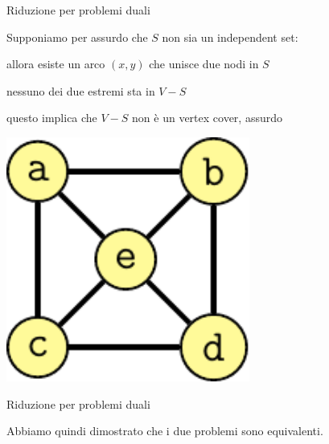 \begin{frame}{Riduzione per problemi duali}

Supponiamo per assurdo che $S$ non sia un independent set:
\BI
\item allora esiste un arco $(x,y)$ che unisce due nodi in $S$
\item nessuno dei due estremi sta in $V-S$
\item questo implica che $V-S$ non è un vertex cover, assurdo
\EI

\begin{center}
\includegraphics[width=0.6\textwidth,page=3]{cover.pdf}
\end{center}

\end{frame}

\begin{frame}{Riduzione per problemi duali}

Abbiamo quindi dimostrato che i due problemi sono equivalenti.

\end{frame}


